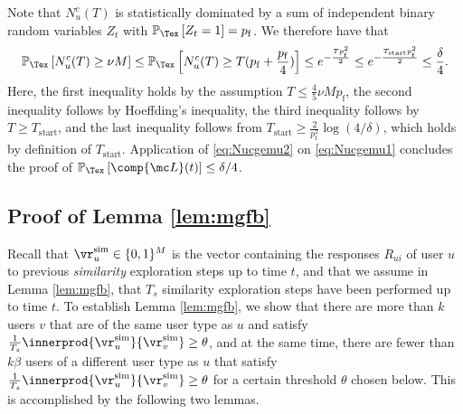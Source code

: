 \documentclass{article}
\newcommand\pf{p_{\mathrm{f}}}
\newcommand{\vratingS}{\vocrating^{\text{sim}}}
\newcommand\vocrating{\vr}
\newcommand\ocR{R}
\renewcommand\PR[2][\Tex]{
\ifthenelse{\equal{#1}{}}{{\mathbb P}\left[#2\right]}{\ensuremath{{\mathbb P}_{#1}\left[ #2\right]}}}
\begin{document}
Note that $N_{u}^c(T)$ is statistically dominated by a sum of independent binary random variables $Z_t$ with $\PR{Z_t = 1} = \pf$. 
We therefore have that 
\begin{align}
\PR{ N_u^c(T) \geq \nu M }
%
\leq 
\PR{ N_{u}^c(T) \geq T (\pf +  \frac{\pf}{4})  }  
%
\leq e^{  -\frac{T \pf^2}{2} }
%
\leq e^{  -\frac{T_{\text{start}} \pf^2}{2} }
%
\leq \frac{\delta}{4}.
\label{eq:Nucgemu2}
\end{align}
Here, the first inequality holds by the assumption $T \leq \frac{4}{5} \nu M \pf$, the second inequality follows by Hoeffding's inequality, the third inequality follows by $T\geq T_{\text{start}}$, and the last inequality follows from 
$T_{\text{start}}  \geq \frac{2}{\pf^2} \log(4/\delta)$, which holds by definition of $T_{\text{start}}$. 
Application of \eqref{eq:Nucgemu2} on \eqref{eq:Nucgemu1} concludes the proof of $\PR{\comp{\mc L}(t) } \leq \delta/4$. 








\subsection{Proof of Lemma \ref{lem:mgfb} }%

\newcommand{\perrg}{p_{\mathrm{good}}}
\newcommand{\perrb}{p_{\mathrm{bad}}}

Recall that $\vratingS_{u} \in \{0,1\}^M$ is the  vector containing the responses $\ocR_{ui}$ of user $u$ to previous \emph{similarity} exploration steps up to time $t$, and that we assume in Lemma \ref{lem:mgfb}, that $T_s$ similarity exploration steps have been performed up to time $t$. 
To establish Lemma \ref{lem:mgfb}, we show that there are more than $k$ users $v$ that are of the same user type as $u$ and satisfy
$
\frac{1}{T_s}\innerprod{\vratingS_u}{\vratingS_v} \geq \theta $, 
and at the same time, there are fewer than $k\beta$ users of a different user type as $u$ that satisfy 
$
\frac{1}{T_s}\innerprod{\vratingS_u}{\vratingS_v} \geq \theta
$
for a certain threshold $\theta$ chosen below. 
This is accomplished by the following two lemmas.
\end{document}
